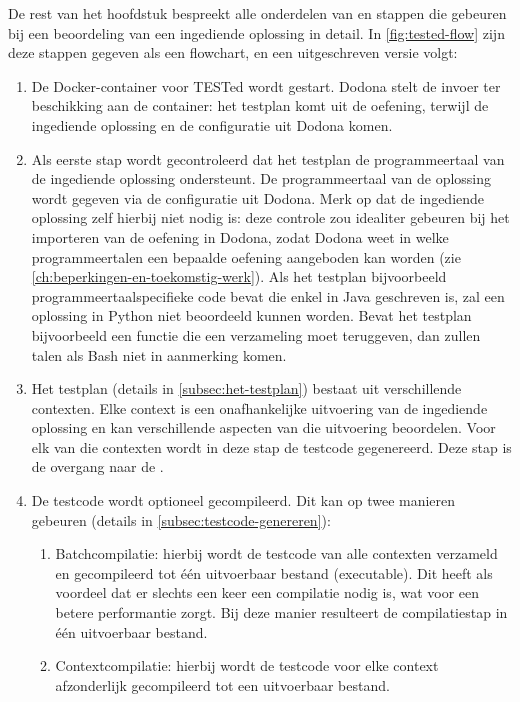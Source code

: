 De rest van het hoofdstuk bespreekt alle onderdelen van en stappen die gebeuren bij een beoordeling van een ingediende oplossing in detail.
In \cref{fig:tested-flow} zijn deze stappen gegeven als een flowchart, en een uitgeschreven versie volgt:

\begin{enumerate}
    \item De Docker-container voor TESTed wordt gestart.
    Dodona stelt de invoer ter beschikking aan de container: het testplan komt uit de oefening, terwijl de ingediende oplossing en de configuratie uit Dodona komen.
    \item Als eerste stap wordt gecontroleerd dat het testplan de programmeertaal van de ingediende oplossing ondersteunt.
    De programmeertaal van de oplossing wordt gegeven via de configuratie uit Dodona.
    Merk op dat de ingediende oplossing zelf hierbij niet nodig is: deze controle zou idealiter gebeuren bij het importeren van de oefening in Dodona, zodat Dodona weet in welke programmeertalen een bepaalde oefening aangeboden kan worden (zie \cref{ch:beperkingen-en-toekomstig-werk}).
    Als het testplan bijvoorbeeld programmeertaalspecifieke code bevat die enkel in Java geschreven is, zal een oplossing in Python niet beoordeeld kunnen worden.
    Bevat het testplan bijvoorbeeld een functie die een verzameling moet teruggeven, dan zullen talen als Bash niet in aanmerking komen.
    \item Het testplan (details in \cref{subsec:het-testplan}) bestaat uit verschillende contexten.
    Elke context is een onafhankelijke uitvoering van de ingediende oplossing en kan verschillende aspecten van die uitvoering beoordelen.
    Voor elk van die contexten wordt in deze stap de testcode gegenereerd.
    Deze stap is de overgang naar de .
    \item De testcode wordt optioneel gecompileerd.
    Dit kan op twee manieren gebeuren (details in \cref{subsec:testcode-genereren}):
    \begin{enumerate}
        \item Batchcompilatie: hierbij wordt de testcode van alle contexten verzameld en gecompileerd tot één uitvoerbaar bestand (executable).
        Dit heeft als voordeel dat er slechts een keer een compilatie nodig is, wat voor een betere performantie zorgt.
        Bij deze manier resulteert de compilatiestap in één uitvoerbaar bestand.
        \item Contextcompilatie: hierbij wordt de testcode voor elke context afzonderlijk gecompileerd tot een uitvoerbaar bestand.

\end{enumerate}
\end{enumerate}
